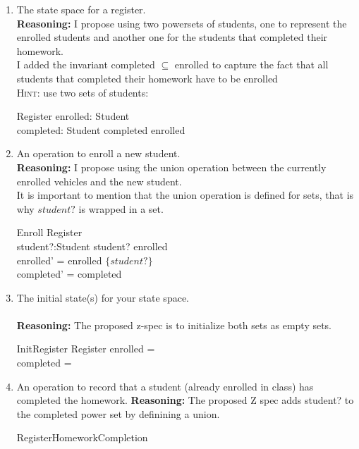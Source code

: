 \documentclass{article}
\begin{document}
\begin{enumerate}
\item The state space for a register. \\
  \textbf{Reasoning:} 
  I propose using two powersets of students, one to represent the enrolled students and another one for the students that completed
  their homework. \\
  I added the invariant completed $\subseteq$ enrolled to capture the fact that all students that completed their homework have to be enrolled \\
\textsc{Hint}: use two sets of students:
\begin{schema}{Register}
enrolled: \power Student\\
completed: \power Student
\where
completed \subseteq enrolled \\
\end{schema}
\item An operation to enroll a new student. \\
  \textbf{Reasoning:}
  I propose using the union operation between the currently enrolled vehicles and the new student. \\
  It is important to mention that the union operation is defined for sets, that is why $student?$ is  wrapped in a set. \\
\begin{schema}{Enroll}
  \Delta Register \\
  student?:Student
  \where
  student? \notin enrolled \\
  enrolled' = enrolled \union $\{student?\}$ \\
  completed' = completed
\end{schema}  
\item The initial state(s)  for your state space. \\
  \\
  \textbf{Reasoning:} The proposed z-spec is to initialize both sets as empty sets. \\
\begin{schema}{InitRegister}
Register
\where
enrolled = \emptyset \\
completed = \emptyset
\end{schema}
\item An operation to record that a student (already enrolled in class) has completed the homework.
  \textbf{Reasoning:} The proposed Z spec adds student? to the completed power set by definining a union. \\
  \begin{schema}{RegisterHomeworkCompletion}

\end{schema}
\end{enumerate}
\end{document}
